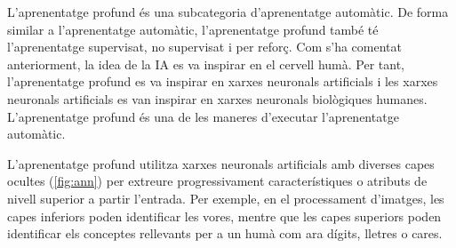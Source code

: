 \begin{refsection}
	L'aprenentatge profund és una subcategoria d'aprenentatge automàtic. De forma similar a l'aprenentatge automàtic, l'aprenentatge profund també té l'aprenentatge supervisat, no supervisat i per reforç. Com s'ha comentat anteriorment, la idea de la IA es va inspirar en el cervell humà. Per tant, l’aprenentatge profund es va inspirar en xarxes neuronals artificials i les xarxes neuronals artificials es van inspirar en xarxes neuronals biològiques humanes. L'aprenentatge profund és una de les maneres d’executar l'aprenentatge automàtic.\supercite{DataCamp,dl}
	
	L'aprenentatge profund utilitza xarxes neuronals artificials amb diverses capes ocultes (\cref{fig:ann}) per extreure progressivament característiques o atributs de nivell superior a partir l’entrada. Per exemple, en el processament d’imatges, les capes inferiors poden identificar les vores, mentre que les capes superiors poden identificar els conceptes rellevants per a un humà com ara dígits, lletres o cares.\supercite{dlwiki}

	\printbibliography[heading=subbibintoc]

\end{refsection}
